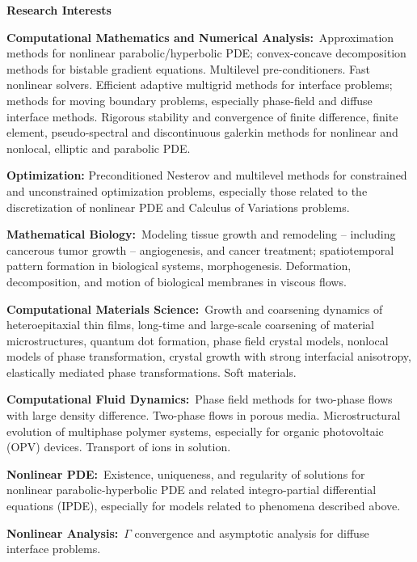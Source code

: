 \documentclass[11pt]{letter}
\begin{document}
{\LARGE\bf  Research Interests}
    \begin{description}
    \item
\textbf{Computational Mathematics and Numerical Analysis:}~Approximation methods for nonlinear parabolic/hyperbolic PDE; convex-concave decomposition methods for bistable gradient equations. Multilevel pre-conditioners. Fast nonlinear solvers. Efficient adaptive multigrid methods for interface problems; methods for moving boundary problems, especially phase-field and diffuse interface methods. Rigorous stability and convergence of finite difference, finite element, pseudo-spectral and discontinuous galerkin methods for nonlinear and nonlocal, elliptic and parabolic PDE.
	\item
\textbf{Optimization:} Preconditioned Nesterov and multilevel methods for constrained and unconstrained optimization problems, especially those related to the discretization of nonlinear PDE and Calculus of Variations problems.

	\item
\textbf{Mathematical Biology:}~Modeling tissue growth and remodeling -- including cancerous tumor growth -- angiogenesis, and cancer treatment; spatiotemporal pattern formation in biological systems, morphogenesis.  Deformation, decomposition, and motion of biological membranes in viscous flows.
	\item
\textbf{Computational Materials Science:}~Growth and coarsening dynamics of heteroepitaxial thin films, long-time and large-scale coarsening of material microstructures, quantum dot formation, phase field crystal models, nonlocal models of phase transformation, crystal growth with strong interfacial anisotropy, elastically mediated phase transformations. Soft materials.
	\item
\textbf{Computational Fluid Dynamics:}~Phase field methods for two-phase flows with large density difference. Two-phase flows in porous media. Microstructural evolution of multiphase polymer systems, especially for organic photovoltaic (OPV) devices. Transport of ions in solution.
	\item
\textbf{Nonlinear PDE:}~Existence, uniqueness, and regularity of solutions for nonlinear parabolic-hyperbolic PDE and related integro-partial differential equations (IPDE), especially for models related to phenomena described above.
	\item
\textbf{Nonlinear Analysis:}~$\Gamma$ convergence and asymptotic analysis for diffuse interface problems.
    \end{description}
	
\end{document}
